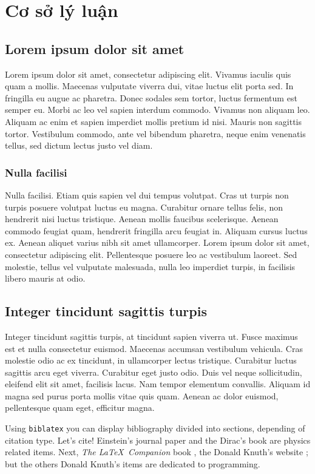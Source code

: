 \chapter{Cơ sở lý luận}

\section{Lorem ipsum dolor sit amet}
Lorem ipsum dolor sit amet, consectetur adipiscing elit. Vivamus iaculis quis quam a mollis. Maecenas vulputate viverra dui, vitae luctus elit porta sed. In fringilla eu augue ac pharetra. Donec sodales sem tortor, luctus fermentum est semper eu. Morbi ac leo vel sapien interdum commodo. Vivamus non aliquam leo. Aliquam ac enim et sapien imperdiet mollis pretium id nisi. Mauris non sagittis tortor. Vestibulum commodo, ante vel bibendum pharetra, neque enim venenatis tellus, sed dictum lectus justo vel diam.\par
\subsection{Nulla facilisi}
Nulla facilisi. Etiam quis sapien vel dui tempus volutpat. Cras ut turpis non turpis posuere volutpat luctus eu magna. Curabitur ornare tellus felis, non hendrerit nisi luctus tristique. Aenean mollis faucibus scelerisque. Aenean commodo feugiat quam, hendrerit fringilla arcu feugiat in. Aliquam cursus luctus ex. Aenean aliquet varius nibh sit amet ullamcorper. Lorem ipsum dolor sit amet, consectetur adipiscing elit. Pellentesque posuere leo ac vestibulum laoreet. Sed molestie, tellus vel vulputate malesuada, nulla leo imperdiet turpis, in facilisis libero mauris at odio.\par
\section{Integer tincidunt sagittis turpis}
Integer tincidunt sagittis turpis, at tincidunt sapien viverra ut. Fusce maximus est et nulla consectetur euismod. Maecenas accumsan vestibulum vehicula. Cras molestie odio ac ex tincidunt, in ullamcorper lectus tristique. Curabitur luctus sagittis arcu eget viverra. Curabitur eget justo odio. Duis vel neque sollicitudin, eleifend elit sit amet, facilisis lacus. Nam tempor elementum convallis. Aliquam id magna sed purus porta mollis vitae quis quam. Aenean ac dolor euismod, pellentesque quam eget, efficitur magna.\par

Using \texttt{biblatex} you can display bibliography divided into sections, 
depending of citation type. 
Let's cite! Einstein's journal paper \cite{bai-bao-1} and the Dirac's 
book \cite{sach-1} are physics related items. 
Next, \textit{The \LaTeX\ Companion} book \cite{website-1}, the Donald Knuth's website \cite{sach-2}; but the others Donald Knuth's items \cite{bai-bao-1} are dedicated to programming.